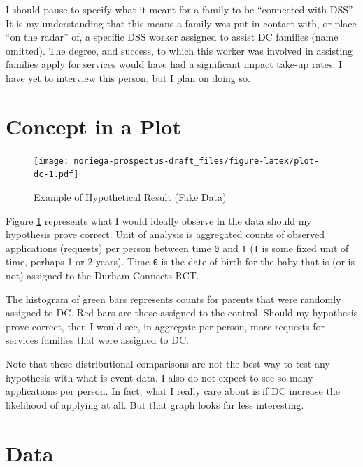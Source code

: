 \documentclass[12pt,letterpaperpaper,]{book}
\begin{document}
I should pause to specify what it meant for a family to be ``connected
with DSS''. It is my understanding that this means a family was put in
contact with, or place ``on the radar'' of, a specific DSS worker
assigned to assist DC families (name omitted). The degree, and success,
to which this worker was involved in assisting families apply for
services would have had a significant impact take-up rates. I have yet
to interview this person, but I plan on doing so.

\newpage

\section*{Concept in a Plot}\label{concept-in-a-plot-1}

\begin{figure}
\centering
\texttt{[image: noriega-prospectus-draft\_files/figure-latex/plot-dc-1.pdf]}
\caption{\label{fig:plot-dc}Example of Hypothetical Result (Fake Data)}
\end{figure}

Figure \ref{fig:plot-dc} represents what I would ideally observe in the
data should my hypothesis prove correct. Unit of analysis is aggregated
counts of observed applications (requests) per person between time
\texttt{0} and \texttt{T} (\texttt{T} is some fixed unit of time,
perhaps 1 or 2 years). Time \texttt{0} is the date of birth for the baby
that is (or is not) assigned to the Durham Connects RCT.

The histogram of green bars represents counts for parents that were
randomly assigned to DC. Red bars are those assigned to the control.
Should my hypothesis prove correct, then I would see, in aggregate per
person, more requests for services families that were assigned to DC.

Note that these distributional comparisons are not the best way to test
any hypothesis with what is event data. I also do not expect to see so
many applications per person. In fact, what I really care about is if DC
increase the likelihood of applying at all. But that graph looks far
less interesting.

\newpage

\section*{Data}\label{data-2}
\end{document}
